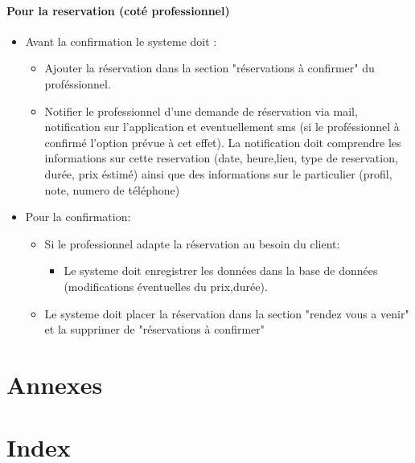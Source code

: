 \documentclass{article}
\begin{document}
\paragraph{Pour la reservation (coté professionnel) }
\begin{itemize}
\item Avant la confirmation le systeme doit :
	\begin{itemize}
	
	\item Ajouter la réservation dans la section "réservations à confirmer" du  proféssionnel.
    \item Notifier le professionnel d'une demande de réservation via mail, notification sur l'application et eventuellement sms (si le proféssionnel à confirmé l'option prévue à cet effet).
		La notification doit comprendre les informations sur cette reservation (date, heure,lieu, type de reservation, durée, prix éstimé)
		ainsi que des informations sur le particulier (profil, note, numero de téléphone)
	\end{itemize}
\item Pour la confirmation:
	\begin{itemize}
	\item Si le professionnel adapte la réservation au besoin du client:
		\begin{itemize}
		\item Le systeme doit enregistrer les données dans la base de données (modifications éventuelles du prix,durée).
		\end{itemize}
	\end{itemize}
	\begin{itemize}
    \item Le systeme doit placer la réservation dans la section "rendez vous a venir" et la supprimer de "réservations à confirmer"
	\end{itemize}
\end{itemize}



\section{Annexes}


\section{Index}
\end{document}
